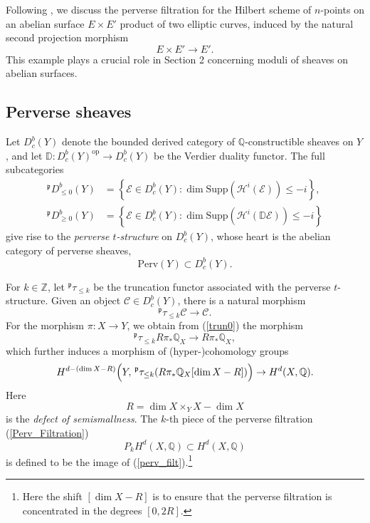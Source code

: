 \documentclass[11pt]{amsart}
\theoremstyle{plain}
\theoremstyle{definition}
\theoremstyle{remark}
\newcommand{\BD}{{\mathbb{D}}}
\newcommand{\BQ}{{\mathbb{Q}}}
\newcommand{\BZ}{{\mathbb{Z}}}
\newcommand{\CC}{{\mathcal C}}
\newcommand{\CE}{{\mathcal E}}
\newcommand{\CH}{{\mathcal H}}
\begin{document}
Following \cite{dCHM3, Z, SZ}, we discuss the perverse filtration for the Hilbert scheme of $n$-points on an abelian surface $E \times E'$ product of two elliptic curves, induced by the natural  second projection morphism
\[
E \times E' \to E'.
\]
 This example plays a crucial role in Section 2 concerning moduli of sheaves on abelian surfaces.

\subsection{Perverse sheaves}
Let $D_c^b(Y)$ denote the bounded derived category of $\BQ$-constructible sheaves on $Y$, and let $\BD: D_c^b(Y)^{\mathrm{op}} \to D_c^b(Y)$ be the Verdier duality functor. The full subcategories 
\begin{align*}
    ^ \mathfrak{p} D_{\leq 0}^b(Y) & = \left\{\CE \in D_c^b(Y): \dim \mathrm{Supp}(\CH^i(\CE)) \leq -i \right\}, \\
    ^ \mathfrak{p} D_{\geq 0}^b(Y) & = \left\{\CE \in D_c^b(Y): \dim \mathrm{Supp}(\CH^i(\BD\CE)) \leq -i \right\}
\end{align*}
give rise to the \emph{perverse $t$-structure} on $D_c^b(Y)$, whose heart is the abelian category of perverse sheaves,
\[
\mathrm{Perv}(Y) \subset D_c^b(Y).
\]

For $k \in \BZ$, let $^\mathfrak{p}\tau_{\leq k}$ be the truncation functor associated with the perverse $t$-structure. Given an object $\CC \in D_c^b(Y)$, there is a natural morphism
\begin{equation}\label{trun0}
^\mathfrak{p}\tau_{\le k}\CC \rightarrow \CC.
\end{equation}
For the morphism $\pi:X \to Y$, we obtain from (\ref{trun0}) the morphism
\[
^\mathfrak{p}\tau_{\le k}R\pi_\ast \BQ_X \rightarrow R\pi_\ast \BQ_X,
\]
which further induces a morphism of (hyper-)cohomology groups
\begin{equation}\label{perv_filt}
H^{d-(\dim X -{ R})}\Big{(}Y, \, ^\mathfrak{p}\tau_{\le k}(R\pi_\ast \BQ_X[\dim X - { R}]) \Big{)} \rightarrow H^d(X, \BQ).
\end{equation}
Here
\begin{equation}\label{defect}
    {R} = \dim X \times_Y X - \dim X
\end{equation}
is the \emph{defect of semismallness}. The $k$-th piece of the perverse filtration (\ref{Perv_Filtration})
\[
P_kH^d(X, \BQ) \subset H^d(X, \BQ)
\]
is defined to be the image of (\ref{perv_filt}).\footnote{Here the shift $[\dim X- {R}]$ is to ensure that the perverse filtration is concentrated in the degrees $[0, 2 { R}]$.} 
\end{document}
